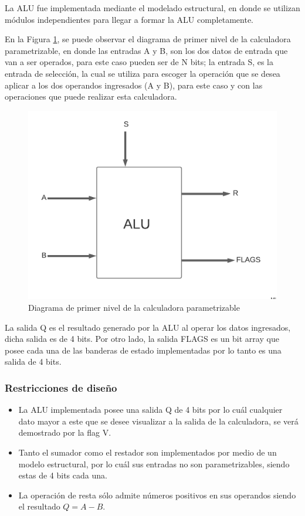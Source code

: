 \documentclass[journal]{IEEEtran}
\begin{document}
	La ALU fue implementada mediante el modelado estructural, en donde se utilizan módulos independientes para llegar a formar la ALU completamente.
	
	
	
	En la Figura \ref{fig:niv11}, se puede observar el diagrama de primer nivel de la calculadora parametrizable, en donde las entradas A y B, son los dos datos de entrada que van a ser operados, para este caso pueden ser de N bits; la entrada S, es la entrada de selección, la cual se utiliza para escoger la operación que se desea aplicar a los dos operandos ingresados (A y B), para este caso y con las operaciones que puede realizar esta calculadora.
	
	
	\begin{figure}[hbtp]
		\centering
		\includegraphics[scale = 0.4]{img/Nivel11.png}
		\caption{Diagrama de primer nivel de la calculadora parametrizable }
		\label{fig:niv11}
	\end{figure}
	
	La salida Q es el resultado generado por la ALU al operar los datos ingresados, dicha salida es de 4 bits. Por otro lado, la salida FLAGS es un bit array que posee cada una de las banderas de estado implementadas por lo tanto es una salida de 4 bits. 
	\subsubsection{Restricciones de diseño}
	\begin{itemize}
		\item La ALU implementada posee una salida Q de 4 bits por lo cuál cualquier dato mayor a este que se desee visualizar a la salida de la calculadora, se verá demostrado por la flag V.
		\item Tanto el sumador como el restador son implementados por medio de un modelo estructural, por lo cuál sus entradas no son parametrizables, siendo estas de 4 bits cada una.
		\item La operación de resta sólo admite números positivos en sus operandos siendo el resultado $Q=A-B$.
	\end{itemize}
\end{document}

